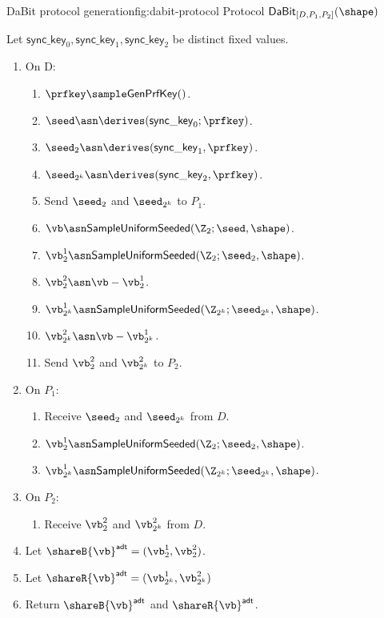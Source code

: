 \begin{Boxfig}{DaBit protocol generation}{fig:dabit-protocol}
  {Protocol $\mathsf{DaBit}_{[D, P_1, P_2]}(\shape)$}
  
  Let $\mathsf{sync\_key}_0, \mathsf{sync\_key}_1, \mathsf{sync\_key}_2$ be distinct fixed values.
  
  \begin{enumerate}
  \item On D:
  \begin{enumerate}
    \item $\prfkey \sample \mathsf{GenPrfKey}()$.
    \item $\seed \asn \derives(\mathsf{sync\_key}_0; \prfkey)$.
    \item $\seed_2 \asn \derives(\mathsf{sync\_key}_1, \prfkey)$.
    \item $\seed_{2^k} \asn \derives(\mathsf{sync\_key}_2, \prfkey)$.
    \item Send $\seed_2$ and $\seed_{2^k}$ to $P_1$.

    \item $\vb \asn \mathsf{SampleUniformSeeded}(\Z_2; \seed, \shape)$.
    \item $\vb^1_{2} \asn \mathsf{SampleUniformSeeded}(\Z_2; \seed_2, \shape)$.
    \item $\vb^2_{2} \asn \vb - \vb^1_{2}$.
    \item $\vb^1_{2^k} \asn \mathsf{SampleUniformSeeded}(\Z_{2^k}; \seed_{2^k}, \shape)$.
    \item $\vb^2_{2^k} \asn \vb - \vb^1_{2^k}$.
    \item Send $\vb^2_2$ and $\vb^2_{2^k}$ to $P_2$.
  \end{enumerate}

  \item On $P_1$:
 \begin{enumerate}
     \item Receive $\seed_2$ and $\seed_{2^k}$ from $D$.
     \item $\vb^1_{2} \asn \mathsf{SampleUniformSeeded}(\Z_2; \seed_2, \shape)$.
     \item $\vb^1_{2^k} \asn \mathsf{SampleUniformSeeded}(\Z_{2^k}; \seed_{2^k}, \shape)$.
 \end{enumerate}
\item On $P_2$:
\begin{enumerate}
    \item Receive $\vb^2_2$ and $\vb^2_{2^k}$ from $D$.
\end{enumerate}
\item Let $\shareB{\vb}^\mathsf{adt} = (\vb^1_2, \vb^2_2)$.
\item Let $\shareR{\vb}^\mathsf{adt} = (\vb^1_{2^k}, \vb^2_{2^k})$
\item Return $\shareB{\vb}^\mathsf{adt}$ and $\shareR{\vb}^\mathsf{adt}$.
\end{enumerate}
\end{Boxfig}

